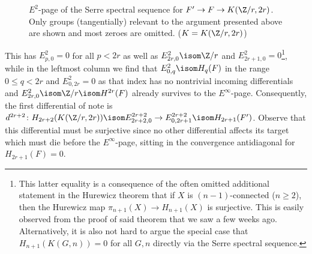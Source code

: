 \begin{solution}
\begin{figure}[ht]
		\caption{$E^2$-page of the Serre spectral sequence for $F' \to F \to K(\Zn{r}, 2r)$. \\ Only groups (tangentially) relevant to the argument presented above are shown and most zeroes are omitted. ($K = K(\Zn{r}, 2r)$)}
		\label{fig:specseq1}
	\end{figure}
	This has $E^2_{p, 0} = 0$ for all $p < 2r$ as well as $E^2_{2r, 0} \isom \Zn{r}$ and $E^2_{2r + 1, 0} = 0$\footnote{This latter equality is a consequence of the often omitted additional statement in the Hurewicz theorem that if $X$ is $(n - 1)$-connected ($n \geq 2$), then the Hurewicz map $\pi_{n + 1}(X) \to H_{n + 1}(X)$ is surjective. This is easily observed from the proof of said theorem that we saw a few weeks ago. Alternatively, it is also not hard to argue the special case that $H_{n + 1}(K(G, n)) = 0$ for all $G, n$ directly via the Serre spectral sequence.}, while in the leftmost column we find that $E^2_{0, q} \isom H_q(F)$ in the range $0 \leq q < 2r$ and $E^2_{0, 2r} = 0$ as that index has no nontrivial incoming differentials and $E^2_{2r, 0} \isom \Zn{r} \isom H^{2r}(F)$ already survives to the $E^\infty$-page. 
	Consequently, the first differential of note is $d^{2r + 2}\colon H_{2r + 2}(K(\Zn{r}, 2r)) \isom E^{2r + 2}_{2r + 2, 0} \to E^{2r + 2}_{0, 2r + 1} \isom H_{2r + 1}(F')$.
	Observe that this differential must be surjective since no other differential affects its target which must die before the $E^\infty$-page, sitting in the convergence antidiagonal for $H_{2r + 1}(F) = 0$.


\end{solution}
